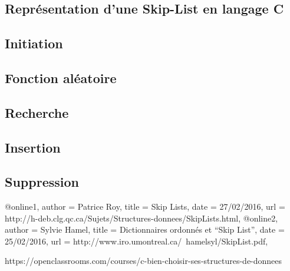 \documentclass[hidelinks,a4paper, 12pt]{article}
\begin{document}
	\begin{appendices}
	\section{Représentation d'une Skip-List en langage C}
	\subsection{Initiation}\label{SKInit}
	
	\subsection{Fonction aléatoire}\label{SKRandom}
	

	\subsection{Recherche}\label{SKSearch}
	

	\subsection{Insertion}\label{SKInsert}
	
	
	\subsection{Suppression}\label{SKDelete}
	
	\newpage
	\end{appendices}
	
	
	@online{1,
		author = {Patrice Roy},
		title = {Skip Lists},
		date = {27/02/2016},
		url = {http://h-deb.clg.qc.ca/Sujets/Structures-donnees/SkipLists.html},
	}
	@online{2,
		author = {Sylvie Hamel},
		title = {Dictionnaires ordonnés et “Skip List”},
		date = {25/02/2016},
		url = {http://www.iro.umontreal.ca/~hamelsyl/SkipList.pdf},
	}
	
	https://openclassrooms.com/courses/c-bien-choisir-ses-structures-de-donnees
	
\end{document}
